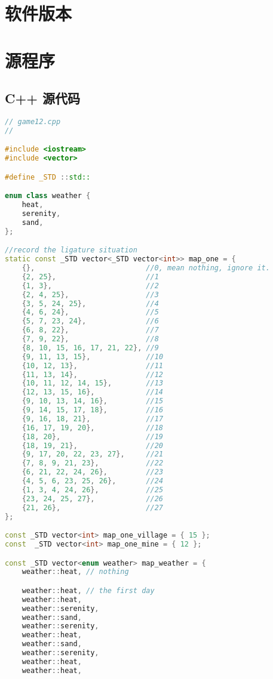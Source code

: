 \documentclass{cumcmthesis}
\begin{document}
\newpage
\begin{appendices}
	\section{软件版本}

	\section{源程序}
	\subsection*{C++ 源代码}
	\begin{lstlisting}[language=c++]
// game12.cpp
//

#include <iostream>
#include <vector>

#define _STD ::std::

enum class weather {
	heat,
	serenity,
	sand,
};

//record the ligature situation
static const _STD vector<_STD vector<int>> map_one = {
	{},                          //0, mean nothing, ignore it.
	{2, 25},                     //1
	{1, 3},                      //2
	{2, 4, 25},                  //3
	{3, 5, 24, 25},              //4
	{4, 6, 24},                  //5
	{5, 7, 23, 24},              //6
	{6, 8, 22},                  //7
	{7, 9, 22},                  //8
	{8, 10, 15, 16, 17, 21, 22}, //9
	{9, 11, 13, 15},             //10
	{10, 12, 13},                //11
	{11, 13, 14},                //12
	{10, 11, 12, 14, 15},        //13
	{12, 13, 15, 16},            //14
	{9, 10, 13, 14, 16},         //15
	{9, 14, 15, 17, 18},         //16
	{9, 16, 18, 21},             //17
	{16, 17, 19, 20},            //18
	{18, 20},                    //19
	{18, 19, 21},                //20
	{9, 17, 20, 22, 23, 27},     //21
	{7, 8, 9, 21, 23},           //22
	{6, 21, 22, 24, 26},         //23
	{4, 5, 6, 23, 25, 26},       //24
	{1, 3, 4, 24, 26},           //25
	{23, 24, 25, 27},            //26
	{21, 26},                    //27
};

const _STD vector<int> map_one_village = { 15 };
const  _STD vector<int> map_one_mine = { 12 };

const _STD vector<enum weather> map_weather = {
	weather::heat, // nothing

	weather::heat, // the first day
	weather::heat,
	weather::serenity,
	weather::sand,
	weather::serenity,
	weather::heat,
	weather::sand,
	weather::serenity,
	weather::heat,
	weather::heat,


\end{lstlisting}
\end{appendices}
\end{document}
